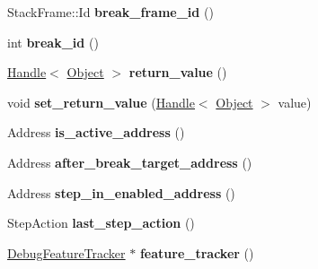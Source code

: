 \begin{DoxyCompactItemize}
\item 
Stack\+Frame\+::\+Id {\bfseries break\+\_\+frame\+\_\+id} ()\hypertarget{classv8_1_1internal_1_1_debug_a6eb3c329a5730e3de1a836659fab737f}{}\label{classv8_1_1internal_1_1_debug_a6eb3c329a5730e3de1a836659fab737f}

\item 
int {\bfseries break\+\_\+id} ()\hypertarget{classv8_1_1internal_1_1_debug_ab5d835a2fc440cf4695c03f0cca6c969}{}\label{classv8_1_1internal_1_1_debug_ab5d835a2fc440cf4695c03f0cca6c969}

\item 
\hyperlink{classv8_1_1internal_1_1_handle}{Handle}$<$ \hyperlink{classv8_1_1internal_1_1_object}{Object} $>$ {\bfseries return\+\_\+value} ()\hypertarget{classv8_1_1internal_1_1_debug_ae617e0ba02cbc2f38e3afd0954a0915b}{}\label{classv8_1_1internal_1_1_debug_ae617e0ba02cbc2f38e3afd0954a0915b}

\item 
void {\bfseries set\+\_\+return\+\_\+value} (\hyperlink{classv8_1_1internal_1_1_handle}{Handle}$<$ \hyperlink{classv8_1_1internal_1_1_object}{Object} $>$ value)\hypertarget{classv8_1_1internal_1_1_debug_a85dc8b3dd0c940e0fdfa57f08a30f2c2}{}\label{classv8_1_1internal_1_1_debug_a85dc8b3dd0c940e0fdfa57f08a30f2c2}

\item 
Address {\bfseries is\+\_\+active\+\_\+address} ()\hypertarget{classv8_1_1internal_1_1_debug_a77b55241314326418891e2f890dd5718}{}\label{classv8_1_1internal_1_1_debug_a77b55241314326418891e2f890dd5718}

\item 
Address {\bfseries after\+\_\+break\+\_\+target\+\_\+address} ()\hypertarget{classv8_1_1internal_1_1_debug_aca4cb431f84d131c6f54c86d9ba6a353}{}\label{classv8_1_1internal_1_1_debug_aca4cb431f84d131c6f54c86d9ba6a353}

\item 
Address {\bfseries step\+\_\+in\+\_\+enabled\+\_\+address} ()\hypertarget{classv8_1_1internal_1_1_debug_a0d6c3ca76f61ad89d72f73b9c09f8032}{}\label{classv8_1_1internal_1_1_debug_a0d6c3ca76f61ad89d72f73b9c09f8032}

\item 
Step\+Action {\bfseries last\+\_\+step\+\_\+action} ()\hypertarget{classv8_1_1internal_1_1_debug_a93af8c4938d17fb18a004e60f805c1cc}{}\label{classv8_1_1internal_1_1_debug_a93af8c4938d17fb18a004e60f805c1cc}

\item 
\hyperlink{classv8_1_1internal_1_1_debug_feature_tracker}{Debug\+Feature\+Tracker} $\ast$ {\bfseries feature\+\_\+tracker} ()\hypertarget{classv8_1_1internal_1_1_debug_aa40b5c572829bff579e3ca8e14e6d056}{}\label{classv8_1_1internal_1_1_debug_aa40b5c572829bff579e3ca8e14e6d056}

\end{DoxyCompactItemize}
